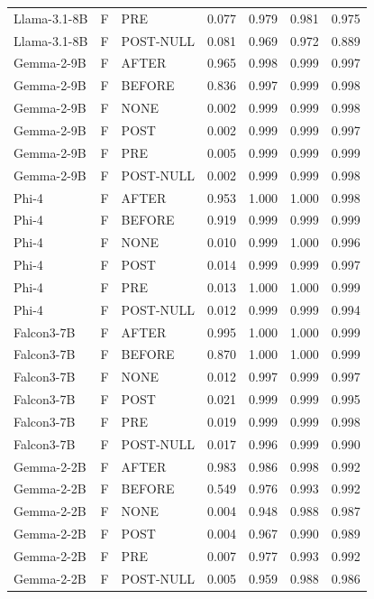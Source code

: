 \begin{tabular}{lllcccc}
Llama-3.1-8B & F & PRE & 0.077 & 0.979 & 0.981 & 0.975 \\
Llama-3.1-8B & F & POST-NULL & 0.081 & 0.969 & 0.972 & 0.889 \\
Gemma-2-9B & F & AFTER & 0.965 & 0.998 & 0.999 & 0.997 \\
Gemma-2-9B & F & BEFORE & 0.836 & 0.997 & 0.999 & 0.998 \\
Gemma-2-9B & F & NONE & 0.002 & 0.999 & 0.999 & 0.998 \\
Gemma-2-9B & F & POST & 0.002 & 0.999 & 0.999 & 0.997 \\
Gemma-2-9B & F & PRE & 0.005 & 0.999 & 0.999 & 0.999 \\
Gemma-2-9B & F & POST-NULL & 0.002 & 0.999 & 0.999 & 0.998 \\
Phi-4 & F & AFTER & 0.953 & 1.000 & 1.000 & 0.998 \\
Phi-4 & F & BEFORE & 0.919 & 0.999 & 0.999 & 0.999 \\
Phi-4 & F & NONE & 0.010 & 0.999 & 1.000 & 0.996 \\
Phi-4 & F & POST & 0.014 & 0.999 & 0.999 & 0.997 \\
Phi-4 & F & PRE & 0.013 & 1.000 & 1.000 & 0.999 \\
Phi-4 & F & POST-NULL & 0.012 & 0.999 & 0.999 & 0.994 \\
Falcon3-7B & F & AFTER & 0.995 & 1.000 & 1.000 & 0.999 \\
Falcon3-7B & F & BEFORE & 0.870 & 1.000 & 1.000 & 0.999 \\
Falcon3-7B & F & NONE & 0.012 & 0.997 & 0.999 & 0.997 \\
Falcon3-7B & F & POST & 0.021 & 0.999 & 0.999 & 0.995 \\
Falcon3-7B & F & PRE & 0.019 & 0.999 & 0.999 & 0.998 \\
Falcon3-7B & F & POST-NULL & 0.017 & 0.996 & 0.999 & 0.990 \\
Gemma-2-2B & F & AFTER & 0.983 & 0.986 & 0.998 & 0.992 \\
Gemma-2-2B & F & BEFORE & 0.549 & 0.976 & 0.993 & 0.992 \\
Gemma-2-2B & F & NONE & 0.004 & 0.948 & 0.988 & 0.987 \\
Gemma-2-2B & F & POST & 0.004 & 0.967 & 0.990 & 0.989 \\
Gemma-2-2B & F & PRE & 0.007 & 0.977 & 0.993 & 0.992 \\
Gemma-2-2B & F & POST-NULL & 0.005 & 0.959 & 0.988 & 0.986 \\
\bottomrule
\end{tabular}
